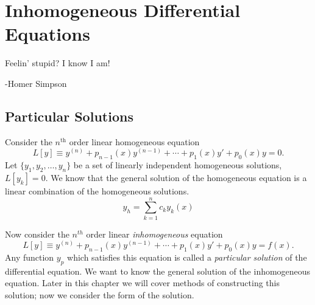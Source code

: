 \flushbottom





\chapter{Inhomogeneous Differential Equations}
\label{chapter_io}

Feelin' stupid?  I know I am!

\begin{flushright}
  -Homer Simpson
\end{flushright}








\section{Particular Solutions}



Consider the $n^{\mathrm{th}}$ order linear homogeneous equation
\[
L[y] \equiv y^{(n)} + p_{n-1}(x) y^{(n-1)} + \cdots + p_1(x) y' + p_0(x) y = 0.
\]
Let $\{y_1, y_2, \ldots, y_n\}$ be a set of linearly independent 
homogeneous solutions, $L[y_k]=0$.  We know that the general solution of 
the homogeneous equation is a linear combination of the homogeneous solutions.
\[
y_h = \sum_{k=1}^n c_k y_k(x)
\]


Now consider the $n^{t h}$ order linear \textit{inhomogeneous} equation
\[
L[y] \equiv y^{(n)} + p_{n-1}(x) y^{(n-1)} + \cdots + p_1(x) y' + p_0(x) y = f(x).
\]
Any function $y_p$ which satisfies this equation is called a 
\textit{particular solution} of the differential equation.
We want to know the general solution of the inhomogeneous equation.
Later in this chapter we will cover methods of constructing this solution;
now we consider the form of the solution.  


